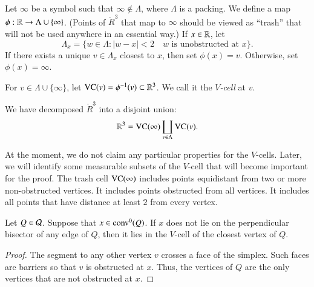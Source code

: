 \begin{definition}[$\phi$]\label{def:trash-phi}
Let $\infty$ be a symbol such that $\infty\not\in\Lambda$,
where $\Lambda$ is a 
packing. We define a map
$\phi:{\mathbb R}\to\Lambda\cup\{\infty\}$.   (Points of $\ring{R}^3$ that
map to $\infty$ should be viewed as ``trash'' that will not be
used anywhere in an essential way.)  If $x\in {\mathbb R}$, let
   $$\Lambda_x = 
   \{w\in\Lambda : |w-x|<2 \quad \text{$w$ is unobstructed at $x$}\}.$$
If there exists a unique $v\in\Lambda_x$ closest to $x$, then set
$\phi(x) = v$. Otherwise, set $\phi(x) = \infty$.
\end{definition}

\begin{definition}[$V$-cell,~$VC$]\label{def:vcell}
For $v\in\Lambda\cup\{\infty\}$, 
let ${\operatorname{VC}}(v)=\phi^{-1}(v)\subset\mathbb{R}^3$.
We call it the {\it $V$-cell\/} at
$v$.
%
\end{definition}

We have decomposed $\ring{R}^3$ into a disjoint union:
    $$
    \mathbb{R}^3 = {\operatorname{VC}}(\infty)\coprod_{v\in\Lambda}{\operatorname{VC}}(v).
    $$

\begin{remark}\label{remark:pathology}
At the moment, we do not claim any particular properties for the
$V$-cells.  Later, we will identify some measurable subsets of the
$V$-cell that will become important for the proof.  The trash cell
${\operatorname{VC}}(\infty)$ includes points equidistant from two or more
non-obstructed vertices.  It includes points obstructed from all
vertices.  It includes all points that have distance at least $2$
from every vertex.
\end{remark}

\begin{lemma}\label{lemma:Q-divide}
Let $Q\in{\mathcal Q}$. Suppose that $x\in {\operatorname{conv}}^0(Q)$.
If $x$
does not lie on the perpendicular bisector of any edge of $Q$,
then it lies in the $V$-cell of the closest vertex of $Q$.
\end{lemma}

\begin{proof} The segment to any other vertex $v$ crosses a face of the
simplex. Such faces are barriers so that $v$ is obstructed at $x$.
Thus, the vertices of $Q$ are the only vertices that are not
obstructed at $x$.
\end{proof}


\label{sec:indexing} \label{sec:compact}

